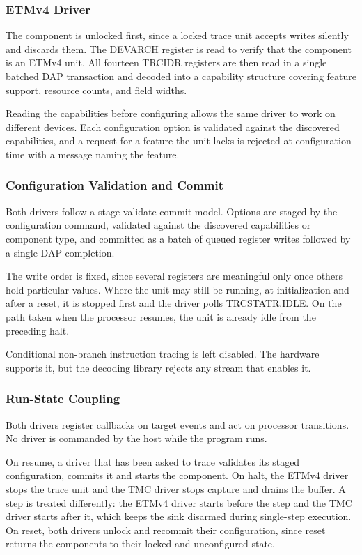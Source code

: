 \subsubsection{ETMv4 Driver}
The component is unlocked first, since a locked trace unit accepts writes silently and discards them. The DEVARCH register is read to verify that the component is an ETMv4 unit. All fourteen TRCIDR registers are then read in a single batched DAP transaction and decoded into a capability structure covering feature support, resource counts, and field widths.

Reading the capabilities before configuring allows the same driver to work on different devices. Each configuration option is validated against the discovered capabilities, and a request for a feature the unit lacks is rejected at configuration time with a message naming the feature.

\subsubsection{Configuration Validation and Commit}
Both drivers follow a stage-validate-commit model. Options are staged by the configuration command, validated against the discovered capabilities or component type, and committed as a batch of queued register writes followed by a single DAP completion.

The write order is fixed, since several registers are meaningful only once others hold particular values. Where the unit may still be running, at initialization and after a reset, it is stopped first and the driver polls TRCSTATR.IDLE. On the path taken when the processor resumes, the unit is already idle from the preceding halt.

Conditional non-branch instruction tracing is left disabled. The hardware supports it, but the decoding library rejects any stream that enables it.

\subsubsection{Run-State Coupling}
Both drivers register callbacks on target events and act on processor transitions. No driver is commanded by the host while the program runs.

On resume, a driver that has been asked to trace validates its staged configuration, commits it and starts the component. On halt, the ETMv4 driver stops the trace unit and the TMC driver stops capture and drains the buffer. A step is treated differently: the ETMv4 driver starts before the step and the TMC driver starts after it, which keeps the sink disarmed during single-step execution. On reset, both drivers unlock and recommit their configuration, since reset returns the components to their locked and unconfigured state.

